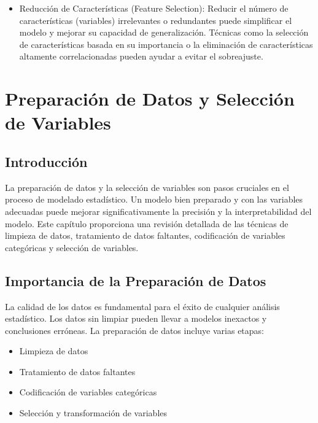 \documentclass[a4paper]{report} %
\begin{document}
\begin{itemize}
\item Reducción de Características (Feature Selection): Reducir el número de características (variables) irrelevantes o redundantes puede simplificar el modelo y mejorar su capacidad de generalización. Técnicas como la selección de características basada en su importancia o la eliminación de características altamente correlacionadas pueden ayudar a evitar el sobreajuste.
\end{itemize}




\chapter{Preparaci\'on de Datos y Selecci\'on de Variables}


\section{Introducci\'on}

La preparaci\'on de datos y la selecci\'on de variables son pasos cruciales en el proceso de modelado estad\'istico. Un modelo bien preparado y con las variables adecuadas puede mejorar significativamente la precisi\'on y la interpretabilidad del modelo. Este cap\'itulo proporciona una revisi\'on detallada de las t\'ecnicas de limpieza de datos, tratamiento de datos faltantes, codificaci\'on de variables categ\'oricas y selecci\'on de variables.

\section{Importancia de la Preparaci\'on de Datos}

La calidad de los datos es fundamental para el \'exito de cualquier an\'alisis estad\'istico. Los datos sin limpiar pueden llevar a modelos inexactos y conclusiones err\'oneas. La preparaci\'on de datos incluye varias etapas:
\begin{itemize}
    \item Limpieza de datos
    \item Tratamiento de datos faltantes
    \item Codificaci\'on de variables categ\'oricas
    \item Selecci\'on y transformaci\'on de variables
\end{itemize}
\end{document}
